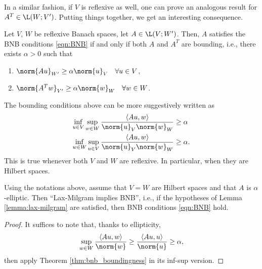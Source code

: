 In a similar fashion, if $V$ is reflexive as well, one can prove an analogous result for $A^T\in\L(W;V')$. Putting things together, we get an interesting consequence.
\begin{theorem}\label{thm:bnb_boundingness}
	Let $V$, $W$ be reflexive Banach spaces, let $A \in \L(V;W')$. Then, $A$ satisfies the BNB conditions \eqref{eqn:BNB} if and only if both $A$ and $A^T$ are bounding, i.e., there exists $\alpha>0$ such that
	\begin{enumerate}
		\item $\norm{Au}_{W'}\geq\alpha\norm{u}_V \quad  \forall u \in V$,
		\item $\norm{A^Tw}_{V'}\geq\alpha\norm{w}_W \quad  \forall w \in W$.
	\end{enumerate}
\end{theorem}

\begin{remark}
	The bounding conditions above can be more suggestively written as
	\begin{align}
		\inf_{u\in V}\sup_{w\in W}\frac{\langle Au,w \rangle}{\norm{u}_V\norm{w}_W}&\geq\alpha \\
		\inf_{w\in W}\sup_{u\in V}\frac{\langle Au,w \rangle}{\norm{u}_V\norm{w}_W}&\geq\alpha.
	\end{align}
	This is true whenever both $V$ and $W$ are reflexive. In particular, when they are Hilbert spaces.
\end{remark}

\begin{corollary}
	Using the notations above, assume that $V=W$ are Hilbert spaces and that $A$ is $\alpha$-elliptic. Then ``Lax-Milgram implies BNB'', i.e., if the hypotheses of Lemma \ref{lemma:lax-milgram} are satisfied, then BNB conditions \eqref{eqn:BNB} hold.
\end{corollary}
\begin{proof}
	It suffices to note that, thanks to ellipticity,
	\[
	\sup_{w\in W}\frac{\langle Au,w \rangle}{\norm{w}} \geq 
	\frac{\langle Au,u \rangle}{\norm{u}} \geq\alpha,
	\]
	then apply Theorem \ref{thm:bnb_boundingness} in its inf-sup version.
\end{proof}


